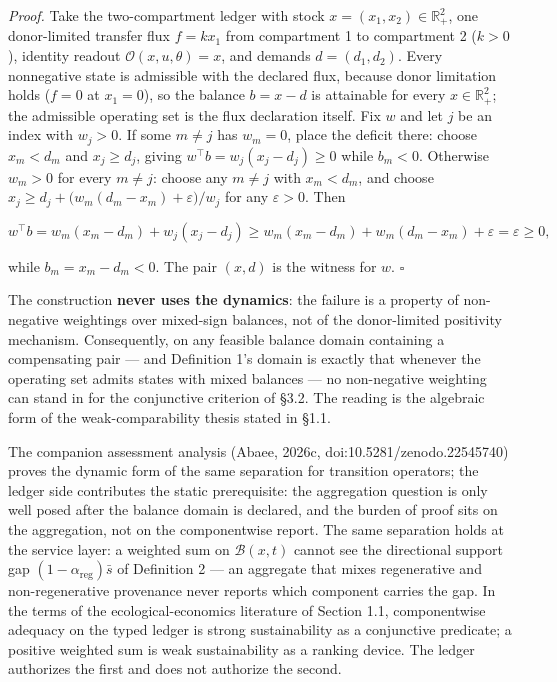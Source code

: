 \documentclass[11pt]{article}
\begin{document}
\emph{Proof.} Take the two-compartment ledger with stock \(x =\allowbreak{} (x_1,\allowbreak{} x_2) \in \mathbb{R}^2_+\allowbreak{}\), one donor-limited transfer flux \(f = kx_1\) from compartment 1 to compartment 2 (\(k > 0\)), identity readout \(\mathcal{O}(x, u, \theta) = x\), and demands \(d = (d_1, d_2)\). Every nonnegative state is admissible with the declared flux, because donor limitation holds (\(f = 0\) at \(x_1 = 0\)), so the balance \(b = x - d\) is attainable for every \(x \in \mathbb{R}^2_+\); the admissible operating set is the flux declaration itself. Fix \(w\) and let \(j\) be an index with \(w_j > 0\). If some \(m \neq j\) has \(w_m = 0\), place the deficit there: choose \(x_m < d_m\) and \(x_j \ge d_j\), giving \(w^\top b =\allowbreak{} w_j (x_j - d_j) \ge 0\) while \(b_m < 0\). Otherwise \(w_m > 0\) for every \(m \neq j\): choose any \(m \neq j\) with \(x_m < d_m\), and choose \(x_j \ge d_j +\allowbreak{} \bigl( w_m (d_m - x_m) +\allowbreak{} \varepsilon \bigr)/w_j\) for any \(\varepsilon > 0\). Then 

$$w^\top b = w_m (x_m - d_m) + w_j (x_j - d_j) \ge w_m (x_m - d_m) + w_m (d_m - x_m) + \varepsilon = \varepsilon \ge 0,$$

 while \(b_m = x_m - d_m < 0\). The pair \((x, d)\) is the witness for \(w\). \(\square\)

The construction \textbf{never uses the dynamics}: the failure is a property of non-negative weightings over mixed-sign balances, not of the donor-limited positivity mechanism. Consequently, on any feasible balance domain containing a compensating pair --- and Definition 1's domain is exactly that whenever the operating set admits states with mixed balances --- no non-negative weighting can stand in for the conjunctive criterion of \S3.2. The reading is the algebraic form of the weak-comparability thesis stated in \S1.1.

The companion assessment analysis (Abaee, 2026c, doi:10.5281/\allowbreak{}zenodo.22545740) proves the dynamic form of the same separation for transition operators; the ledger side contributes the static prerequisite: the aggregation question is only well posed after the balance domain is declared, and the burden of proof sits on the aggregation, not on the componentwise report. The same separation holds at the service layer: a weighted sum on \(\mathcal{B}(x,t)\) cannot see the directional support gap \((1 - \alpha_{\mathrm{reg}})\bar s\) of Definition 2 --- an aggregate that mixes regenerative and non-regenerative provenance never reports which component carries the gap. In the terms of the ecological-economics literature of Section 1.1, componentwise adequacy on the typed ledger is strong sustainability as a conjunctive predicate; a positive weighted sum is weak sustainability as a ranking device. The ledger authorizes the first and does not authorize the second.
\end{document}

